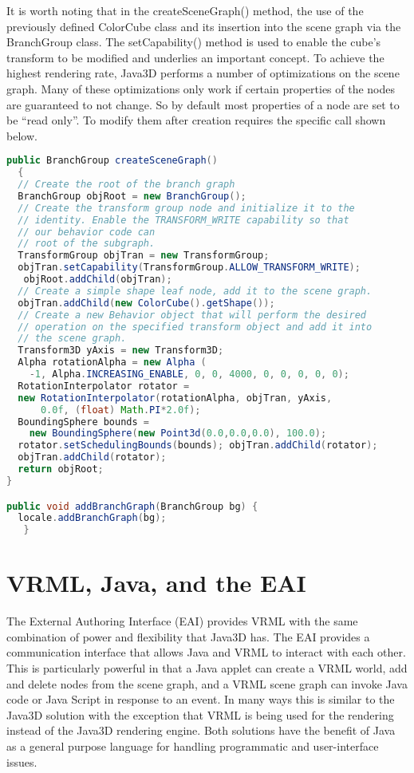 It is worth noting that in the createSceneGraph() method, the use of the previously defined ColorCube class and its insertion into the scene graph via the BranchGroup class. The setCapability() method is used to enable the cube's transform to be modified and underlies an important concept. To achieve the highest rendering rate, Java3D performs a number of optimizations on the scene graph. Many of these optimizations only work if certain properties of the nodes are guaranteed to not change. So by default most properties of a node are set to be ``read only''. To modify them after creation requires the specific call shown below.

\begin{lstlisting}[language=Java, caption={}, numbers=none, frame=none]
public BranchGroup createSceneGraph()
  {
  // Create the root of the branch graph
  BranchGroup objRoot = new BranchGroup();
  // Create the transform group node and initialize it to the
  // identity. Enable the TRANSFORM_WRITE capability so that
  // our behavior code can
  // root of the subgraph.
  TransformGroup objTran = new TransformGroup;
  objTran.setCapability(TransformGroup.ALLOW_TRANSFORM_WRITE);
   objRoot.addChild(objTran);
  // Create a simple shape leaf node, add it to the scene graph.
  objTran.addChild(new ColorCube().getShape());
  // Create a new Behavior object that will perform the desired
  // operation on the specified transform object and add it into
  // the scene graph.
  Transform3D yAxis = new Transform3D;
  Alpha rotationAlpha = new Alpha (
    -1, Alpha.INCREASING_ENABLE, 0, 0, 4000, 0, 0, 0, 0, 0);
  RotationInterpolator rotator =
  new RotationInterpolator(rotationAlpha, objTran, yAxis,
      0.0f, (float) Math.PI*2.0f);
  BoundingSphere bounds =
    new BoundingSphere(new Point3d(0.0,0.0,0.0), 100.0);
  rotator.setSchedulingBounds(bounds); objTran.addChild(rotator);
  objTran.addChild(rotator);
  return objRoot;
}

public void addBranchGraph(BranchGroup bg) {
  locale.addBranchGraph(bg);
   }
\end{lstlisting}

\section{VRML, Java, and the EAI}

The External Authoring Interface (EAI) provides VRML with the same combination of power and flexibility that Java3D has. The EAI provides a communication interface that allows Java and VRML to interact with each other. This is particularly powerful in that a Java applet can create a VRML world, add and delete nodes from the scene graph, and a VRML scene graph can invoke Java code or Java Script in response to an event. In many ways this is similar to the Java3D solution with the exception that VRML is being used for the rendering instead of the Java3D rendering engine. Both solutions have the benefit of Java as a general purpose language for handling programmatic and user-interface issues.

